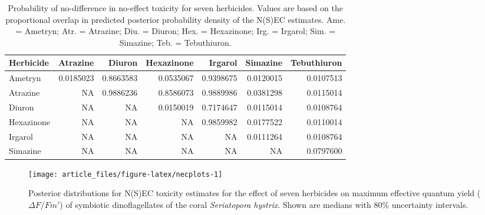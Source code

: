\documentclass[
  shortnames]{jss}
\begin{document}
\begin{CodeChunk}
\begin{table}

\caption{\label{tab:probdiffs}Probability of no-difference in no-effect toxicity for seven herbicides. Values are based on the proportional overlap in predicted posterior probability density of the N(S)EC estimates. Ame. = Ametryn; Atr. = Atrazine; Diu. = Diuron; Hex. = Hexazinone; Irg. = Irgarol; Sim. = Simazine; Teb. = Tebuthiuron.}
\centering
\begin{tabular}[t]{l|r|r|r|r|r|r}
\hline
Herbicide & Atrazine & Diuron & Hexazinone & Irgarol & Simazine & Tebuthiuron\\
\hline
Ametryn & 0.0185023 & 0.8663583 & 0.0535067 & 0.9398675 & 0.0120015 & 0.0107513\\
\hline
Atrazine & NA & 0.9886236 & 0.8586073 & 0.9889986 & 0.0381298 & 0.0115014\\
\hline
Diuron & NA & NA & 0.0150019 & 0.7174647 & 0.0115014 & 0.0108764\\
\hline
Hexazinone & NA & NA & NA & 0.9859982 & 0.0177522 & 0.0110014\\
\hline
Irgarol & NA & NA & NA & NA & 0.0111264 & 0.0108764\\
\hline
Simazine & NA & NA & NA & NA & NA & 0.0797600\\
\hline
\end{tabular}
\end{table}

\end{CodeChunk}

\begin{CodeChunk}
\begin{figure}[!ht]

{\centering \texttt{[image: article\_files/figure-latex/necplots-1]} 

}

\caption[Posterior distributions for N(S)EC toxicity estimates for the effect of seven herbicides on maximum effective quantum yield ($\Delta F / Fm'$) of symbiotic dinoflagellates of the coral \textit{Seriatopora hystrix}]{Posterior distributions for N(S)EC toxicity estimates for the effect of seven herbicides on maximum effective quantum yield ($\Delta F / Fm'$) of symbiotic dinoflagellates of the coral \textit{Seriatopora hystrix}. Shown are medians with 80\%  uncertainty intervals.}\label{fig:necplots}
\end{figure}
\end{CodeChunk}
\end{document}
